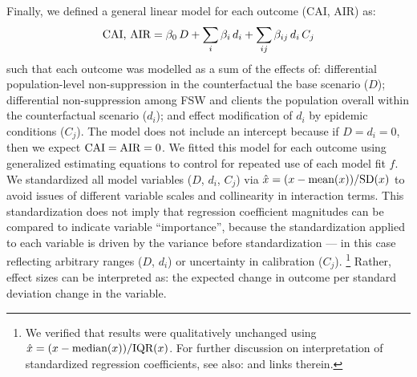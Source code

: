 \par
Finally, we defined a general linear model for each outcome (CAI, AIR) as:
\begin{equation}\label{eq:art.2.glm}
  \textnormal{CAI, AIR} = \beta_0\,D
                 + \sum_i \beta_i\,d_i
                 + \sum_{ij} \beta_{ij}\,d_i\,C_j
\end{equation}
such that each outcome was modelled as a sum of the effects of:
differential population-level non-suppression in the counterfactual \vs the base scenario ($D$);
differential non-suppression among FSW and clients
\vs the population overall within the counterfactual scenario ($d_i$); and
effect modification of $d_i$ by epidemic conditions ($C_j$).
The model does not include an intercept because if $D = d_i = 0$,
then we expect $\textnormal{CAI} = \textnormal{AIR} = 0$.
We fitted this model for each outcome using generalized estimating equations
to control for repeated use of each model fit $f$.
We standardized all model variables ($D$, $d_i$, $C_j$) via
$\hat{x} = (x - \textnormal{mean}(x)) / \textnormal{SD}(x)$
to avoid issues of different variable scales and collinearity in interaction terms.
This standardization does not imply that
regression coefficient magnitudes can be compared to indicate variable ``importance'',
because the standardization applied to each variable is driven
by the variance before standardization
--- in this case reflecting arbitrary ranges ($D$, $d_i$) or uncertainty in calibration ($C_j$).%
\footnote{We verified that results were qualitatively unchanged using
  $\hat{x} = (x - \textnormal{median}(x)) / \textnormal{IQR}(x)$.
  For further discussion on interpretation of standardized regression coefficients,
  see also:  and links therein.}
Rather, effect sizes can be interpreted as:
the expected change in outcome per standard deviation change in the variable.
